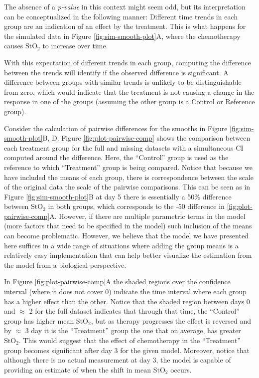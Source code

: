 \documentclass[
]{article}
\begin{document}
The absence of a \emph{p-value} in this context might seem odd, but its interpretation can be conceptualized in the following manner: Different time trends in each group are an indication of an effect by the treatment. This is what happens for the simulated data in Figure \ref{fig:sim-smooth-plot}A, where the chemotherapy causes \(\mbox{StO}_2\) to increase over time.

With this expectation of different trends in each group, computing the difference between the trends will identify if the observed difference is significant. A difference between groups with similar trends is unlikely to be distinguishable from zero, which would indicate that the treatment is not causing a change in the response in one of the groups (assuming the other group is a Control or Reference group).

Consider the calculation of pairwise differences for the smooths in Figure \ref{fig:sim-smooth-plot}B, D. Figure \ref{fig:plot-pairwise-comp} shows the comparison between each treatment group for the full and missing datasets with a simultaneous CI computed around the difference. Here, the ``Control'' group is used as the reference to which ``Treatment'' group is being compared. Notice that because we have included the means of each group, there is correspondence between the scale of the original data the scale of the pairwise comparisons. This can be seen as in Figure \ref{fig:sim-smooth-plot}B at day 5 there is essentially a 50\% difference between \(\mbox{StO}_2\) in both groups, which corresponds to the -50 difference in \ref{fig:plot-pairwise-comp}A. However, if there are multiple parametric terms in the model (more factors that need to be specified in the model) such inclusion of the means can become problematic. However, we believe that the model we have presented here suffices in a wide range of situations where adding the group means is a relatively easy implementation that can help better visualize the estimation from the model from a biological perspective.

In Figure \ref{fig:plot-pairwise-comp}A the shaded regions over the confidence interval (where it does not cover 0) indicate the time interval where each group has a higher effect than the other. Notice that the shaded region between days 0 and \(\approx\) 2 for the full dataset indicates that through that time, the ``Control'' group has higher mean \(\mbox{StO}_2\), but as therapy progresses the effect is reversed and by \(\approx\) 3 day it is the ``Treatment'' group the one that on average, has greater \(\mbox{StO}_2\). This would suggest that the effect of chemotherapy in the ``Treatment'' group becomes significant after day 3 for the given model. Moreover, notice that although there is no actual measurement at day 3, the model is capable of providing an estimate of when the shift in mean \(\mbox{StO}_2\) occurs.
\end{document}
